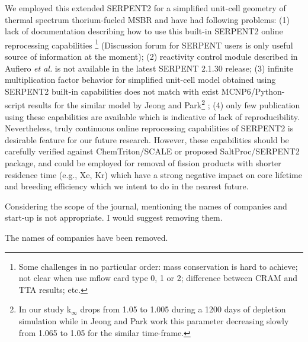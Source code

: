 \documentclass[answers,11pt]{exam}
\begin{document}
\begin{questions}
\begin{solution}
                We employed this extended SERPENT2 for a simplified unit-cell 
                geometry of thermal spectrum thorium-fueled MSBR and have had 
                following problems: (1) lack of documentation describing how 
                to use this built-in SERPENT2 online reprocessing capabilities
                \footnote{ Some challenges in no particular order: mass 
                conservation is hard to achieve; not clear when use mflow card 
                type 0, 1 or 2; difference between CRAM and TTA results; etc.} 
				(Discussion forum for SERPENT users is only useful 
				source of information at the moment); (2) reactivity control 
				module described in Aufiero \emph{et al.} is not available 
				in the latest SERPENT 2.1.30 release; (3) infinite multiplication 
				factor behavior for simplified unit-cell model obtained using 
				SERPENT2 built-in capabilities \cite{rykhlevskii_online_2017} 
				does not match with exist MCNP6/Python-script results for the 
				similar model by Jeong and Park\footnote{ In our study 
				k$_{\infty}$ drops from 1.05 to 1.005 during a 1200 days of 
				depletion simulation while in Jeong and Park work this parameter 
				decreasing slowly from 1.065 to 1.05 for the 
				similar time-frame.} \cite{jeong_equilibrium_2016}; (4) only few 
				publication \cite{aufiero_extended_2013, ashraf_nuclear_2018} 
				using these capabilities are available which is indicative of 
				lack of reproducibility. Nevertheless, truly continuous 
				online reprocessing capabilities of SERPENT2 is desirable feature 
				for our future research. However, these capabilities should be 
				carefully verified against ChemTriton/SCALE or proposed 
				SaltProc/SERPENT2 package, and could be employed 
				for removal of fission products with shorter residence time 
				(e.g., Xe, Kr) which have a strong negative impact on core 
				lifetime and breeding efficiency which we intent to do in 
				the nearest future.
        \end{solution}


        \question Considering the scope of the journal, mentioning the names of 
        companies and start-up is not appropriate. I would suggest removing 
        them.
        \begin{solution}
                The names of companies have been removed.
        \end{solution}


\end{questions}
\end{document}

